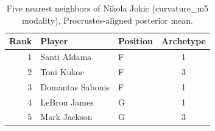 \begin{table}[htbp]
  \centering\small
  \begin{tabular}{rllc}
    \toprule
    Rank & Player & Position & Archetype \\
    \midrule
    1 & Santi Aldama & F & 1 \\
    2 & Toni Kukoc & F & 3 \\
    3 & Domantas Sabonis & F & 1 \\
    4 & LeBron James & G & 1 \\
    5 & Mark Jackson & G & 3 \\
    \bottomrule
  \end{tabular}
  \caption{Five nearest neighbors of Nikola Jokic (curvature_m5 modality), Procrustes-aligned posterior mean.}
  \label{tab:Nikola_Jokic_neighbors_curvature_m5}
\end{table}

